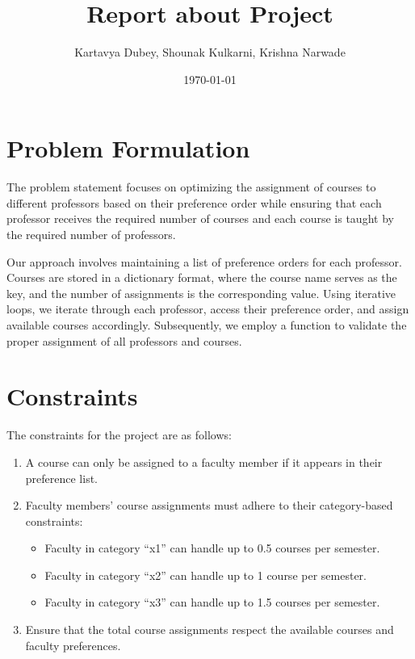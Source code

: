 \documentclass{article}
\title{\textbf{Report about Project}}
\author{Kartavya Dubey, Shounak Kulkarni, Krishna Narwade}
\date{\today}
\begin{document}
\maketitle

\section{Problem Formulation}

The problem statement focuses on optimizing the assignment of courses to different professors based on their preference order while ensuring that each professor receives the required number of courses and each course is taught by the required number of professors.

Our approach involves maintaining a list of preference orders for each professor. Courses are stored in a dictionary format, where the course name serves as the key, and the number of assignments is the corresponding value. Using iterative loops, we iterate through each professor, access their preference order, and assign available courses accordingly. Subsequently, we employ a function to validate the proper assignment of all professors and courses.

\section{Constraints}

The constraints for the project are as follows:

\begin{enumerate}[label=\arabic*.]
    \item A course can only be assigned to a faculty member if it appears in their preference list.
    \item Faculty members' course assignments must adhere to their category-based constraints:
    \begin{itemize}[label=--]
        \item Faculty in category ``x1'' can handle up to 0.5 courses per semester.
        \item Faculty in category ``x2'' can handle up to 1 course per semester.
        \item Faculty in category ``x3'' can handle up to 1.5 courses per semester.
    \end{itemize}
    \item Ensure that the total course assignments respect the available courses and faculty preferences.
\end{enumerate}
\end{document}
